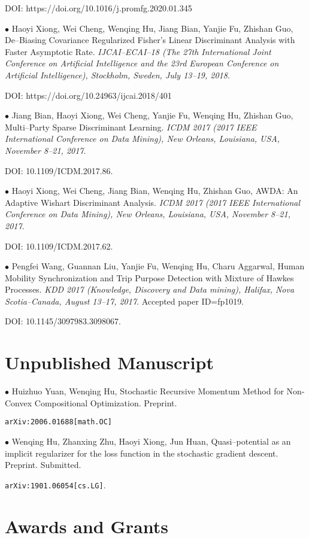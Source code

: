 \documentclass[margin,line]{res}
\begin{document}
\begin{resume}
DOI: https://doi.org/10.1016/j.promfg.2020.01.345

$\bullet$ Haoyi Xiong, Wei Cheng, Wenqing Hu, Jiang Bian, Yanjie Fu, Zhishan Guo,
De--Biasing Covariance Regularized Fisher's Linear Discriminant Analysis
with Faster Asymptotic Rate. \textit{IJCAI--ECAI--18 (The
27th International Joint Conference on Artificial Intelligence and the
23rd European Conference on Artificial Intelligence), Stockholm, Sweden, July 13--19, 2018}.

DOI: https://doi.org/10.24963/ijcai.2018/401

$\bullet$ Jiang Bian, Haoyi Xiong, Wei Cheng, Yanjie Fu, Wenqing Hu, Zhishan Guo,
Multi--Party Sparse Discriminant Learning.
\textit{ICDM 2017 (2017 IEEE International Conference on Data Mining), New Orleans, Louisiana, USA, November 8--21, 2017}.

DOI: 10.1109/ICDM.2017.86.

$\bullet$ Haoyi Xiong, Wei Cheng, Jiang Bian, Wenqing Hu, Zhishan Guo,
AWDA: An Adaptive Wishart Discriminant Analysis.
\textit{ICDM 2017 (2017 IEEE International Conference on Data Mining), New Orleans, Louisiana, USA, November 8--21, 2017}.

DOI: 10.1109/ICDM.2017.62.

$\bullet$ Pengfei Wang, Guannan Liu, Yanjie Fu, Wenqing Hu, Charu Aggarwal,
Human Mobility Synchronization and Trip Purpose Detection with Mixture of Hawkes Processes.
\textit{KDD 2017 (Knowledge, Discovery and Data mining), Halifax, Nova Scotia--Canada,
August 13--17, 2017}. Accepted paper ID=fp1019.

DOI: 10.1145/3097983.3098067.


\section{\sc Unpublished Manuscript}

$\bullet$ Huizhuo Yuan, Wenqing Hu, Stochastic Recursive Momentum Method for Non-Convex Compositional Optimization. Preprint. 

\verb"arXiv:2006.01688[math.OC]"

$\bullet$ Wenqing Hu, Zhanxing Zhu, Haoyi Xiong, Jun Huan, Quasi--potential as an implicit regularizer for the loss function
in the stochastic gradient descent. Preprint. Submitted.

\verb"arXiv:1901.06054[cs.LG]".



\section{\sc Awards and Grants}


\end{resume}
\end{document}
